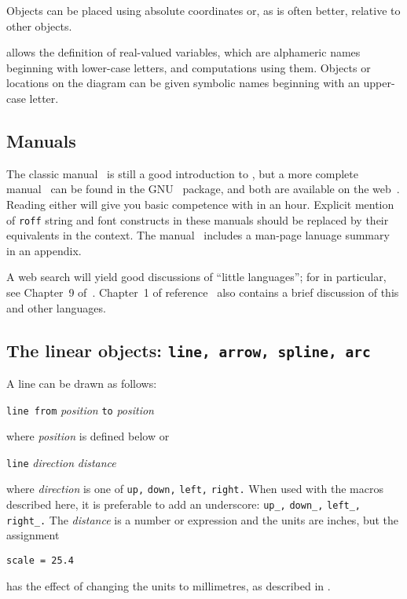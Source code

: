 Objects can be placed using absolute coordinates or,
as is often better, relative to other objects.

\Pic allows the definition of real-valued variables, which are alphameric
names beginning with lower-case letters, and computations using them.
Objects or locations on the diagram can be given symbolic names
beginning with an upper-case letter.

\subsection{Manuals\label{Manuals:}}
The classic \pic manual~\cite{KRpic} is still a good introduction to \pic, but
a more complete manual~\cite{Raymond95} can be found in the GNU \groff\
package, and both are available on the web~\cite{KRpic,Raymond95}.  Reading
either will give you basic competence with \pic in an hour.  Explicit mention
of {\tt *roff} string and font constructs in these manuals should be replaced by
their equivalents in the \latex context.
The \dpic manual~\cite{Aplevich2022} includes a man-page lanuage
summary in an appendix.

A web search will yield good discussions of ``little languages'';
for \pic in particular, see Chapter~9 of~\cite{Bentley88}.
Chapter~1 of reference~\cite{Goossens97} also contains a brief
discussion of this and other languages.

\subsection{The linear objects: {\tt line, arrow, spline, arc}%
\label{Linearobjects:}}
A line can be drawn as follows:

{\tt line from} {\sl position} {\tt to} {\sl position}

\noindent
where {\sl position} is defined below or

{\tt line} {\sl direction} {\sl distance}

\noindent
where {\sl direction} is one of {\tt up,} {\tt down,} {\tt left,}
{\tt right.}  When used with the \Mfour macros described here, it is
preferable to add an underscore: {\tt up\_,} {\tt down\_,} {\tt left\_,}
{\tt right\_.}  The {\sl distance} is a number or expression
and the units are inches, but the assignment

{\tt scale = 25.4}

\noindent
has the effect of changing the units to millimetres,
as described in .

